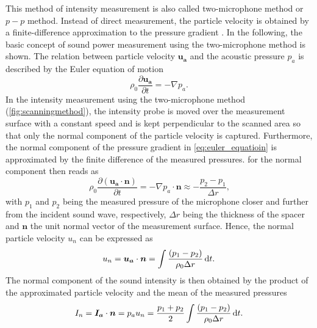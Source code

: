 This method of intensity measurement is also called two-microphone method or $p-p$ method.
Instead of direct measurement, the particle velocity is obtained by a finite-difference approximation to the pressure gradient \cite{jocobsen_2005}\cite{moschioni_2008}.
In the following, the basic concept of sound power measurement using the two-microphone method is shown. The relation between particle velocity $\boldsymbol{u_a}$ and the acoustic pressure $p_a$ is described by the Euler equation of motion
\begin{equation}
    \rho_0 \frac{\partial \boldsymbol{u_a}}{\partial t} = -\nabla p_a \text{.} \label{eq:euler_equatioin}
\end{equation}
In the intensity measurement using the two-microphone method (\cref{fig:scanningmethod}), the intensity probe is moved over the measurement surface with a constant speed and is kept perpendicular to the scanned area so that only the normal component of the particle velocity is captured. Furthermore, the normal component of the pressure gradient in \cref{eq:euler_equatioin} is approximated by the finite difference of the measured pressures.  for the normal component then reads as
\begin{equation}
	\rho_0\frac{\partial(\boldsymbol{u_a} \cdot \boldsymbol{n})}{\partial t} = -\nabla p_a \cdot \boldsymbol{n} \approx -\frac{p_2 - p_1}{\Delta r}\text{,}
\end{equation}
with $p_1$ and $p_2$ being the measured pressure of the microphone closer and further from the incident sound wave, respectively, $\Delta r$ being the thickness of the spacer and $\boldsymbol{n}$ the unit normal vector of the measurement surface. Hence, the normal particle velocity $u_n$ can be expressed as
\begin{equation}
   u_n = \boldsymbol{u_a} \cdot \boldsymbol{n} = \int\frac{(p_1 - p_2)}{\rho_0 \Delta r}\dif t \text{.}
\end{equation}
The normal component of the sound intensity is then obtained by the product of the approximated particle velocity and the mean of the measured pressures
\begin{equation}
    I_n = \boldsymbol{I_a} \cdot \boldsymbol{n} = p_a u_n = \frac{p_1 + p_2}{2} \int\frac{(p_1 - p_2)}{\rho_0 \Delta r}\dif t\text{.}
\end{equation}

